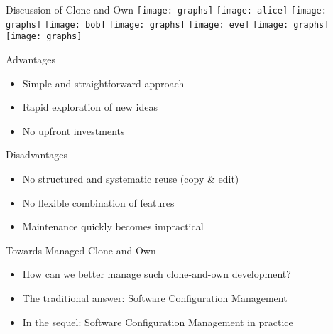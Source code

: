 \begin{frame}{Discussion of Clone-and-Own}
	\texttt{[image: graphs]}
	\hfill
	\texttt{[image: alice]}%
	\texttt{[image: graphs]}
	\hfill
	\texttt{[image: bob]}%
	\texttt{[image: graphs]}
	\hfill
	\texttt{[image: eve]}%
	\texttt{[image: graphs]}
	\hfill
	\texttt{[image: graphs]}

	\begin{mycolumns}[columns=2,widths={45,55},animation=none]
		\begin{note}{Advantages}
			\begin{itemize}
				\item Simple and straightforward approach
				\item Rapid exploration of new ideas
				\item No upfront investments
			\end{itemize}
		\end{note}
	\mynextcolumn
		\begin{note}{Disadvantages}
			\begin{itemize}
				\item No structured and systematic reuse (copy \& edit)
				\item No flexible combination of features
				\item Maintenance quickly becomes impractical
			\end{itemize}
		\end{note}
	\end{mycolumns}	
	\begin{mycolumns}[columns=3,widths={15,70}]
	\mynextcolumn
		\begin{note}{Towards Managed Clone-and-Own}
			\begin{itemize}
				\item How can we better manage such clone-and-own development?
				\item The traditional answer: Software Configuration Management
				\item In the sequel: Software Configuration Management in practice
			\end{itemize}
		\end{note}
	\mynextcolumn
	\end{mycolumns}
\end{frame}

